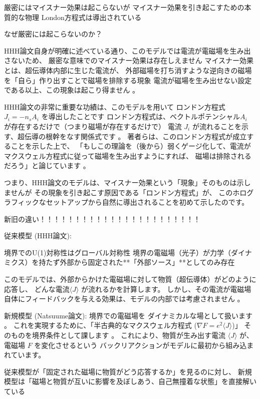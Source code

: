 \documentclass[b5paper,11pt,dvipdfmx]{jsarticle}
\numberwithin{equation}{section}
\theoremstyle{definition}
\begin{document}
厳密にはマイスナー効果は起こらないが
マイスナー効果を引き起こすための本質的な物理
London方程式は導出されている

なぜ厳密には起こらないのか？

HHH論文自身が明確に述べている通り、このモデルでは電流が電磁場を生み出さないため、
厳密な意味でのマイスナー効果は存在しえません
マイスナー効果とは、超伝導体内部に生じた電流が、
外部磁場を打ち消すような逆向きの磁場を「自ら」作り出すことで磁場を排除する現象
電流が磁場を生み出せない設定である以上、この現象は起こり得ません 。

HHH論文の非常に重要な功績は、このモデルを用いて
ロンドン方程式 $J_i = -n_s A_i$ を導出したことです
ロンドン方程式は、ベクトルポテンシャル$A_i$ が存在するだけで（つまり磁場が存在するだけで）
電流 $J_i$ が流れることを示す、超伝導の根幹をなす関係式です 。
著者らは、このロンドン方程式が成立することを示した上で、
「もしこの理論を（後から）弱くゲージ化して、電流がマクスウェル方程式に従って磁場を生み出すようにすれば、
磁場は排除されるだろう」と論じています 。

つまり、HHH論文のモデルは、マイスナー効果という「現象」そのものは示しませんが
その現象を引き起こす原因である「ロンドン方程式」が、
このホログラフィックなセットアップから自然に導出されることを初めて示したのです。










新旧の違い！！！！！！！！！！！！！！！！！！！！！！！

従来模型 (HHH論文):

境界でのU(1)対称性はグローバル対称性
境界の電磁場（光子）が力学（ダイナミクス）を持たず外部から固定された**「外部ソース」**としてのみ存在

このモデルでは、外部からかけた電磁場に対して物質（超伝導体）がどのように応答し、
どんな電流$\langle J \rangle$ が流れるかを計算します。
しかし、その電流が電磁場自体にフィードバックを与える効果は、モデルの内部では考慮されません 。

新規模型 (Natsuume論文):
境界での電磁場を
ダイナミカルな場として扱います 。
これを実現するために、「半古典的なマクスウェル方程式 ($\nabla F = e^2 \langle J \rangle$)」
そのものを境界条件として課します 。
これにより、物質が生み出す電流 $\langle J \rangle$ が、電磁場 $F$ を変化させるという
バックリアクションがモデルに最初から組み込まれています。

従来模型が「固定された磁場に物質がどう応答するか」を見るのに対し、
新規模型は「磁場と物質が互いに影響を及ぼしあう、自己無撞着な状態」を直接解いている
\end{document}
